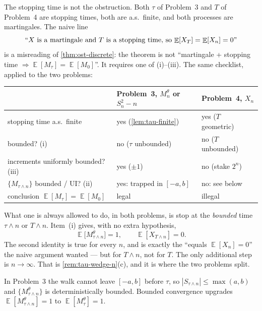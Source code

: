 \documentclass[11pt,a4paper]{article}
\DeclareMathOperator{\E}{\mathbb{E}}
\begin{document}
\begin{remark}
\label{rem:p4-ost-fails}
The stopping time is not the obstruction. Both \( \tau \) of Problem~3 and \( T \) of Problem~4 are stopping times, both are a.s.\ finite, and both processes are martingales. The naive line
\[
\text{``\( X \) is a martingale and \( T \) is a stopping time, so \( \E[X_T]=\E[X_n]=0 \)''}
\]
is a misreading of \cref{thm:ost-discrete}: the theorem is not ``martingale + stopping time \( \Rightarrow\E[M_{\tau}]=\E[M_0] \)''. It requires one of (i)--(iii). The same checklist, applied to the two problems:

\begin{center}
\renewcommand{\arraystretch}{1.2}
\small
\begin{tabular}{@{}lll@{}}
\toprule
 & Problem~3, \( M_n^{\theta} \) or \( S_n^{2}-n \) & Problem~4, \( X_n \) \\
\midrule
stopping time a.s.\ finite & yes (\cref{lem:tau-finite}) & yes (\( T \) geometric) \\
bounded? (i) & no (\( \tau \) unbounded) & no (\( T \) unbounded) \\
increments uniformly bounded? (iii) & yes (\( \pm 1 \)) & no (stake \( 2^{n} \)) \\
\( \{M_{\tau\wedge n}\} \) bounded / UI? (ii)
  & yes: trapped in \( [-a,b] \)
  & no: see below \\
conclusion \( \E[M_{\tau}]=\E[M_0] \) & legal & illegal \\
\bottomrule
\end{tabular}
\end{center}

What one is always allowed to do, in both problems, is stop at the \emph{bounded} time \( \tau\wedge n \) or \( T\wedge n \). Item~(i) gives, with no extra hypothesis,
\[
\E\bigl[M_{\tau\wedge n}^{\theta}\bigr]
=
1,
\qquad
\E[X_{T\wedge n}]
=
0.
\]
The second identity is true for every \( n \), and is exactly the ``equals \( \E[X_n]=0 \)'' the naive argument wanted --- but for \( T\wedge n \), not for \( T \). The only additional step is \( n\to\infty \). That is \cref{rem:tau-wedge-n}(c), and it is where the two problems split.

In Problem~3 the walk cannot leave \( [-a,b] \) before \( \tau \), so \( |S_{\tau\wedge n}|\le\max(a,b) \) and \( \{M_{\tau\wedge n}^{\theta}\} \) is deterministically bounded. Bounded convergence upgrades \( \E[M_{\tau\wedge n}^{\theta}]=1 \) to \( \E[M_{\tau}^{\theta}]=1 \).


\end{remark}
\end{document}
